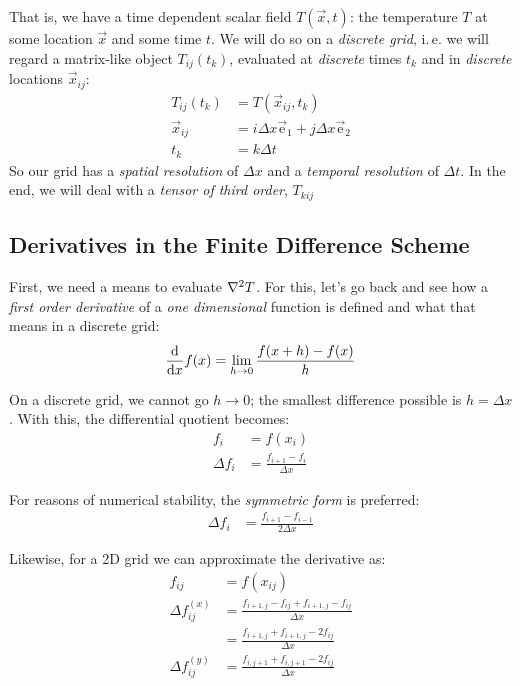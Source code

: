 \documentclass[
	english,
	fontsize=10pt,
	parskip=half,
	titlepage=true,
	DIV=12
]{scrartcl}
\newcommand*{\ie}{i.\,e. }
\begin{document}
That is, we have a time dependent scalar field $T(\vec{x}, t)$: the temperature $T$ at some location $\vec{x}$ and some time $t$. We will do so on a \emph{discrete grid}, \ie we will regard a matrix-like object $T_{ij}(t_k)$, evaluated at \emph{discrete} times $t_k$ and in \emph{discrete} locations $\vec{x}_{ij}$:
\begin{align*}
	T_{ij}(t_k) &= T(\vec{x}_{ij}, t_k) \\
	\vec{x}_{ij} &= i \Delta x \vec{\text{e}}_1  + j \Delta x \vec{\text{e}}_2 \\
	t_k &= k \Delta t
\end{align*}
So our grid has a \emph{spatial resolution} of $\Delta x$ and a \emph{temporal resolution} of $\Delta t$. In the end, we will deal with a \emph{tensor of third order}, $T_{kij}$

\subsection{Derivatives in the Finite Difference Scheme}
First, we need a means to evaluate $\laplacian T$. For this, let's go back and see how a \emph{first order derivative} of a \emph{one dimensional} function is defined and what that means in a discrete grid:
\[ \dv{x} f(x) = \lim_{h \to 0} \frac{f(x + h) - f(x)}{h} \]

On a discrete grid, we cannot go $h \to 0$; the smallest difference possible is $h = \Delta x$. With this, the differential quotient becomes:
\begin{align*}
	f_i &= f(x_i) \\
	\Delta f_i &= \frac{f_{i + 1} - f_i}{\Delta x}
\end{align*}

For reasons of numerical stability, the \emph{symmetric form} is preferred:
\begin{align*}
	\Delta f_{i} &= \frac{f_{i + 1} - f_{i - 1}}{2\Delta x}
\end{align*}

Likewise, for a 2D grid we can approximate the derivative as:
\begin{align*}
	f_{ij} &= f(x_{ij}) \\
	\Delta f^{(x)}_{ij} 
&=
	\frac{f_{i + 1, j} - f_{ij} + f_{i + 1, j} - f_{ij}}{\Delta x} \\
&=
	\frac{f_{i + 1, j} + f_{i + 1, j} - 2 f_{ij}}{\Delta x}
\\
	\Delta f^{(y)}_{ij} 
&=
	\frac{f_{i, j + 1} + f_{i, j + 1} - 2 f_{ij}}{\Delta x}
\end{align*}
\end{document}
